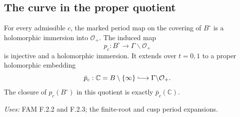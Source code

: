 \subsection{The curve in the proper quotient}
\begin{theorem}[FAM F.3.1; T]\label{fam:F.3.1}
For every admissible $c$, the marked period map on the covering of
$B^\circ$ is a holomorphic immersion into $\mathcal O_+$.  The induced
map
\[
 p_c:B^\circ\longrightarrow\Gamma\backslash\mathcal O_+
\]
is injective and a holomorphic immersion.  It extends over $t=0,1$ to a
proper holomorphic embedding
\[
 \bar p_c:\mathbb C=B\setminus\{\infty\}
 \lhook\joinrel\longrightarrow\Gamma\backslash\mathcal O_+.
\]
The closure of $p_c(B^\circ)$ in this quotient is exactly
$\bar p_c(\mathbb C)$.
\end{theorem}
\noindent\emph{Uses:} FAM F.2.2 and F.2.3; the finite-root and cusp period expansions.\par

